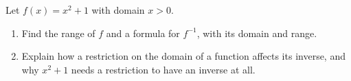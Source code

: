 Let $f(x)=x^2+1$ with domain $x>0$.
\begin{enumerate}
\item[(a)] Find the range of $f$ and a formula for $f^{-1}$, with its domain and range.
\item[(b)] Explain how a restriction on the domain of a function affects its inverse, and why $x^2+1$ needs a restriction to have an inverse at all.
\end{enumerate}

